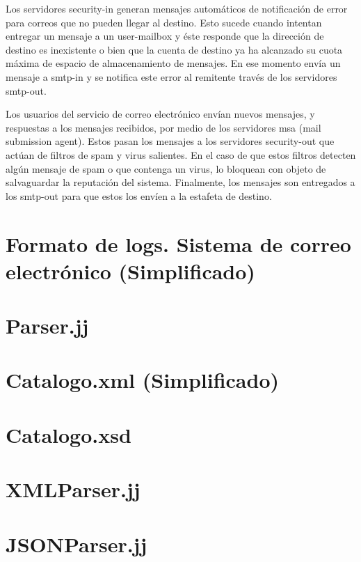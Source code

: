 Los servidores security-in generan mensajes automáticos de notificación de error para correos que no pueden llegar al destino. Esto sucede cuando intentan entregar un mensaje a un user-mailbox y éste responde que la dirección de destino es inexistente o bien que la cuenta de destino ya ha alcanzado su cuota máxima de espacio de almacenamiento de mensajes. En ese momento envía un mensaje a smtp-in y se notifica este error al remitente través de los servidores smtp-out.

Los usuarios del servicio de correo electrónico envían nuevos mensajes, y respuestas a los mensajes recibidos, por medio de los servidores msa (mail submission agent). Estos pasan los mensajes a los servidores security-out que actúan de filtros de spam y virus salientes. En el caso de que estos filtros detecten algún mensaje de spam o que contenga un virus, lo bloquean con objeto de salvaguardar la reputación del sistema. Finalmente, los mensajes son entregados a los smtp-out para que estos los envíen a la estafeta de destino.

\newpage
\section{Formato de logs. Sistema de correo electrónico (Simplificado)}
\label{sec:logscorreo}
\lstset{inputencoding=utf8/latin1}


\newpage
\section{Parser.jj}
\label{sec:P2Parser}
\lstset{inputencoding=utf8/latin1}


\newpage
\section{Catalogo.xml (Simplificado)}
\label{sec:catalogoxml}
\lstset{inputencoding=utf8/latin1}


\newpage
\section{Catalogo.xsd }
\label{sec:catalogoxsd}
\lstset{inputencoding=utf8/latin1}


\newpage
\section{XMLParser.jj}
\label{sec:XMLParser}
\lstset{inputencoding=utf8/latin1}


\newpage
\section{JSONParser.jj}
\label{sec:JSONParser}
\lstset{inputencoding=utf8/latin1}


\restoregeometry
